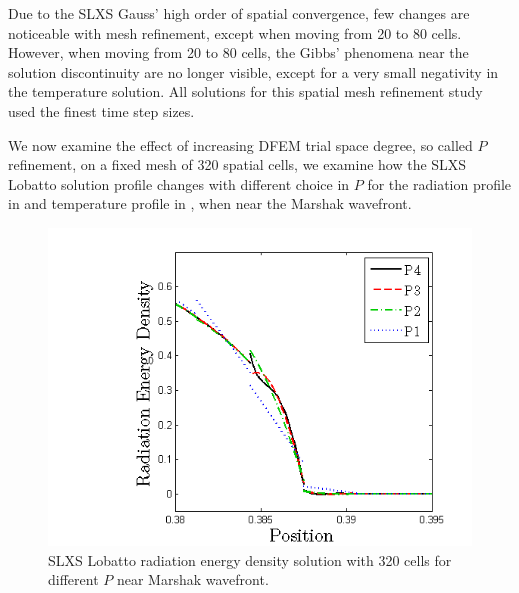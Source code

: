 Due to the SLXS Gauss' high order of spatial convergence, few changes are noticeable with mesh refinement, except when moving from 20 to 80 cells.
However, when moving from 20 to 80 cells, the Gibbs' phenomena near the solution discontinuity are no longer visible, except for a very small negativity in the temperature solution.
All solutions for this spatial mesh refinement study used the finest time step sizes.

We now examine the effect of increasing DFEM trial space degree, so called $P$ refinement, on a fixed mesh of 320 spatial cells, we examine how the SLXS Lobatto solution profile changes with different choice in $P$ for the radiation profile in  and temperature profile in , when near the Marshak wavefront.
\begin{figure}[!hbp]
\centering
\includegraphics[width=12cm]{chapter6_grey_radtran/Dissertation_Data/Pointless_Marshak_Zoom_Radiation_Lobatto_P_Refinement.png}
\caption{SLXS Lobatto radiation energy density solution with 320 cells for different $P$ near Marshak wavefront.}
\label{fig:p_convergence_rad}
\end{figure}

\pagebreak

